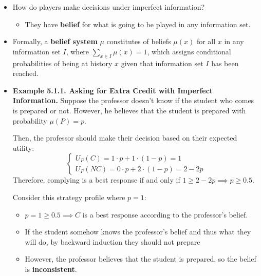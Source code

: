 \documentclass[notitlepage]{article}
\begin{document}
\begin{itemize}
    \item How do players make decisions under imperfect information?
    \begin{itemize}
        \item They have \textbf{belief} for what is going to be played in any information set.
    \end{itemize}

    \item Formally, a \textbf{belief system} \(\mu\) constitutes of beliefs \(\mu(x)\) for all \(x\) in any information set \(I\), where \(\sum_{x\in I}\mu(x) = 1\), which assigns conditional probabilities of being at history \(x\) given that information set \(I\) has been reached.

    \item \textbf{Example 5.1.1. Asking for Extra Credit with Imperfect Information.} Suppose the professor doesn't know if the student who comes is prepared or not. However, he believes that the student is prepared with probability \(\mu(P) = p\).
    
    \begin{figure}[h]
        \centering
        \resizebox{0.3\textwidth}{!}{
        
        }
    \end{figure}
    
    Then, the professor should make their decision based on their expected utility:
    \[
    \begin{cases}
        U_P(C) = 1 \cdot p + 1 \cdot (1-p) = 1  \\
        U_P(NC) = 0 \cdot p + 2 \cdot (1-p) = 2-2p
    \end{cases}
    \]
    Therefore, complying is a best response if and only if \(1 \ge 2-2p \implies p \ge 0.5\).

    Consider this strategy profile where \(p=1\):
    \begin{figure}[h]
        \centering
        \resizebox{0.3\textwidth}{!}{
        
        }
    \end{figure}
    \begin{itemize}
        \item \(p=1 \ge 0.5 \implies C\) is a best response according to the professor's belief.
        \item If the student somehow knows the professor's belief and thus what they will do, by backward induction they should not prepare
        \item However, the professor believes that the student is prepared, so the belief is \textbf{inconsistent}.
    \end{itemize}


\end{itemize}
\end{document}
